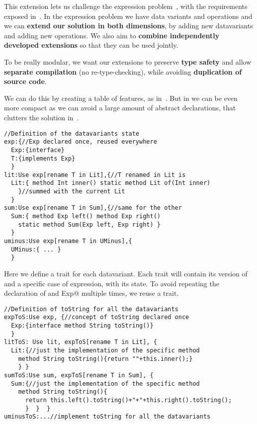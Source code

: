 This extension lets us challenge the expression problem~\cite{wadler1998expression},
with the requirements exposed in~\cite{scala}.
In the expression problem we have data variants and operations and we can
\textbf{extend our solution in both dimensions},
by adding new datavariants and adding new operations.
We also aim to \textbf{combine independently developed extensions} so
that they can be used jointly.

To be really modular, we want our extensions to
preserve \textbf{type safety}
and allow \textbf{separate compilation} (no re-type-checking),
while avoiding \textbf{duplication of source code}.

We can do this by creating a table of features, as in~\cite{Deepfjig}.
But in \name we can be even more compact as we can avoid a large amount of abstract declarations,
that clutters the solution in~\cite{Deepfjig}.


\begin{lstlisting}
//Definition of the datavariants state
exp:{//Exp declared once, reused everywhere
  Exp:{interface}
  T:{implements Exp}
  }
lit:Use exp[rename T in Lit],{//T renamed in Lit is 
  Lit:{ method Int inner() static method Lit of(Int inner)
    }//summed with the current Lit
  }
sum:Use exp[rename T in Sum],{//same for the other
  Sum:{ method Exp left() method Exp right()
    static method Sum(Exp left, Exp right) }
  }
uminus:Use exp[rename T in UMinus],{
  UMinus:{ ... }
  }

\end{lstlisting}
Here we define a trait for each datavariant.
Each trait will contain its version of \Q@Exp@
and a specific case of expression, with its state.
 To avoid repeating the declaration of \Q@Exp@ 
and \Q@implements Exp@ multiple times, we reuse
a \Q@exp@ trait.

\begin{lstlisting}
//Definition of toString for all the datavariants
expToS:Use exp, {//concept of toString declared once
  Exp:{interface method String toString()}
  }
litToS: Use lit, expToS[rename T in Lit], {
  Lit:{//just the implementation of the specific method
    method String toString(){return ""+this.inner();}
    } }
sumToS:Use sum, expToS[rename T in Sum], {
  Sum:{//just the implementation of the specific method
    method String toString(){
      return this.left().toString()+"+"+this.right().toString();
      }  }  }
uminusToS:...//implement toString for all the datavariants
\end{lstlisting}

